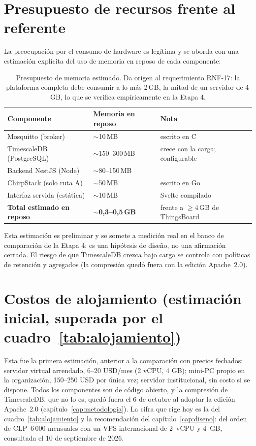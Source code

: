 \section{Presupuesto de recursos frente al referente}

La preocupación por el consumo de hardware es legítima y se aborda con una estimación explícita del
uso de memoria en reposo de cada componente:

\begin{table}[H]
\centering\footnotesize
\begin{tabular}{@{}L{5.0cm}L{3.2cm}L{4.4cm}@{}}
\toprule
\textbf{Componente} & \textbf{Memoria en reposo} & \textbf{Nota} \\
\midrule
Mosquitto (broker) & $\sim$10\,MB & escrito en C \\
TimescaleDB (PostgreSQL) & $\sim$150--300\,MB & crece con la carga; configurable \\
Backend NestJS (Node) & $\sim$80--150\,MB & \\
ChirpStack (solo ruta A) & $\sim$50\,MB & escrito en Go \\
Interfaz servida (estática) & $\sim$10\,MB & Svelte compilado \\
\midrule
\textbf{Total estimado en reposo} & $\sim$\textbf{0,3--0,5\,GB} & frente a $\geq$4\,GB de ThingsBoard \\
\bottomrule
\end{tabular}
\caption{Presupuesto de memoria estimado. Da origen al requerimiento RNF-17: la plataforma completa
debe consumir a lo más 2\,GB, la mitad de un servidor de 4\,GB, lo que se verifica empíricamente en la Etapa 4.}
\end{table}

Esta estimación es preliminar y se somete a medición real en el banco de comparación de la Etapa 4:
es una hipótesis de diseño, no una afirmación cerrada. El riesgo de que TimescaleDB crezca bajo
carga se controla con políticas de retención y agregados (la compresión quedó fuera con la edición Apache~2.0).

\section{Costos de alojamiento (estimación inicial, superada por el cuadro~\ref{tab:alojamiento})}

Esta fue la primera estimación, anterior a la comparación con precios fechados: servidor virtual
arrendado, 6--20 USD/mes (2 vCPU, 4 GB); mini-PC propio en la organización, 150--250 USD por única
vez; servidor institucional, sin costo si se dispone. Todos los componentes son de código abierto,
y la compresión de TimescaleDB, que no lo es, quedó fuera el 6 de octubre al adoptar la edición Apache~2.0 (capítulo~\ref{cap:metodologia}). La cifra que rige hoy es la del cuadro~\ref{tab:alojamiento} y la recomendación del
capítulo~\ref{cap:diseno}: del orden de CLP~6\,000 mensuales con un VPS internacional de 2~vCPU y
4~GB, consultada el 10 de septiembre de 2026.
